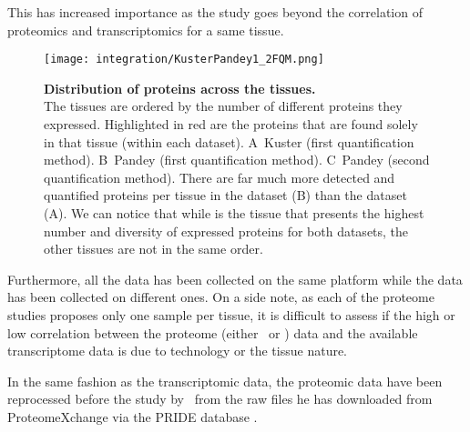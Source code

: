 This has increased importance as the study goes beyond the correlation of
proteomics and transcriptomics for a same tissue.

\newcommand{\figKustPandFQM}{\textbf{Distribution of proteins across the
tissues.}\\The tissues are ordered by the number of different proteins they
expressed. Highlighted in red are the proteins that are found solely in that
tissue (within each dataset).
A\textbar\ Kuster (first quantification method).
B\textbar\ Pandey (first quantification method).
C\textbar\ Pandey (second quantification method).
There are far much more detected and quantified proteins per tissue in the
\dataset{Pandey \etal} dataset (B\textbar) than the
\dataset{Kuster \etal} dataset (A\textbar). We can notice that while
\tissue{Testis} is the tissue that presents the highest number and
diversity of expressed proteins for both datasets, the other tissues are not in
the same order.}


\begin{figure}[!htbp]
    \texttt{[image: integration/KusterPandey1\_2FQM.png]}\centering
    \caption[Distribution of proteins across the
    tissues]{\label{fig:KusterPandeyFQM}\figKustPandFQM}
\end{figure}

Furthermore, all the  data has been
collected on the same platform while the  data has been
collected on different ones.
On a side note,
as each of the proteome studies proposes only one sample per tissue,
it is difficult to assess if the high or low correlation
between the proteome (either \pandey\ or \kuster) data and
the available transcriptome data is due to technology or the tissue nature.

In the same fashion as the transcriptomic data,
the proteomic data have been reprocessed before the study
by \james\ from the raw files he has downloaded from ProteomeXchange
\citep{ProteomeXchange:2014} via the PRIDE database \citep{Pride:2016}.


